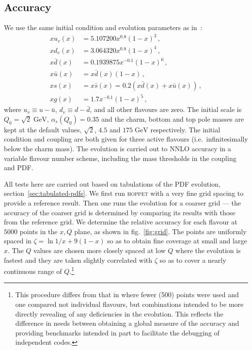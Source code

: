 \documentclass[12pt]{article}
\newcommand{\GeV}{\;\mathrm{GeV}}
\newcommand{\as}{\alpha_s}
\newcommand{\ie}{i.e.\ }
\newcommand{\hoppet}{\textsc{hoppet}\xspace}
\begin{document}
\subsection{Accuracy}
We use the same initial condition and evolution parameters as
in~\cite{Benchmarks}:
\begin{subequations}
  \label{eq:init}
  \begin{align}
    x u_v(x)   &= 5.107200 x^{0.8} (1-x)^3\,,\\
    x d_v(x)   &= 3.064320 x^{0.8} (1-x)^4\,,\\
    x\bar d(x) &= 0.1939875 x^{-0.1} (1-x)^6\,,\\
    x\bar u(x) &= x\bar d(x) (1-x)\,,\\
    x     s(x) &= x\bar s(x) = 0.2(x\bar d(x) + x\bar u(x))\,,\\
    x g(x) &= 1.7 x^{-0.1} (1-x)^5\,,
  \end{align}
\end{subequations}
where $u_v \equiv u - \bar u$, $d_v \equiv d - \bar d$, and all other
flavours are zero. The initial scale is $Q_0 = \sqrt{2} \GeV$,
$\as(Q_0) = 0.35$ and the charm, bottom and top pole masses are kept
at the default values, $\sqrt{2}$, $4.5$ and $175\GeV$ respectively.
The initial condition and coupling are both given for three active
flavours (\ie infinitesimally below the charm mass). The evolution is
carried out to NNLO accuracy in a variable flavour number scheme,
including the mass thresholds in the coupling and PDF.

All tests here are carried out based on tabulations of the PDF
evolution, section~\ref{sec:tabulated-pdfs}.
%
We first run \hoppet with a very fine grid spacing to provide a
reference result. Then one runs the evolution for a coarser grid ---
the accuracy of the coarser grid is determined by comparing its
results with those from the reference grid. We determine the relative
accuracy for each flavour at $5000$ points in the $x, Q$ plane, as
shown in fig.~\ref{fig:grid}. The points are uniformly spaced in
$\zeta = \ln 1/x + 9(1-x)$ so as to obtain fine coverage at small and
large $x$. The $Q$ values are chosen more closely spaced at low $Q$
where the evolution is fastest and they are taken slightly correlated
with $\zeta$ so as to cover a nearly continuous range of
$Q$.\footnote{This procedure differs from that in \cite{Benchmarks}
  where fewer (500) points were used and one compared not individual
  flavours, but combinations intended to be more directly revealing of
  any deficiencies in the evolution. This reflects the difference in
  needs between obtaining a global measure of the accuracy and
  providing benchmarks intended in part to facilitate the debugging of
  independent codes.}
\end{document}
